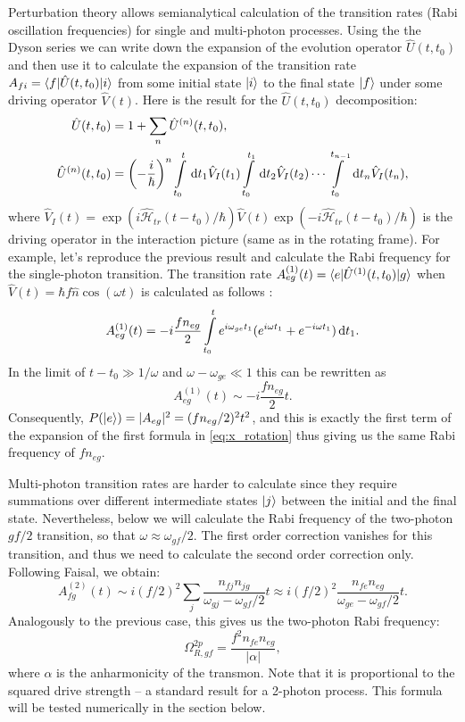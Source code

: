 Perturbation theory allows semianalytical calculation of the transition rates	(Rabi oscillation frequencies) for single and multi-photon processes. Using the the Dyson series we can write down the expansion of the evolution operator $\hat U(t, t_0)$  and then use it to calculate the expansion of the transition rate $A_{fi} = \langle f\rvert\hat U(t, t_0)\lvert i\rangle$ from some initial state $\lvert i\rangle$ to the final state $\lvert f\rangle$ under some driving operator $\hat V(t)$. Here is the result for the $\hat U(t, t_0)$ decomposition:\cite{faisal2013}
\begin{equation}
\begin{aligned}
\hat U(t, t_0) &= 1 + \sum_n \hat U^{(n)}(t, t_0),\\
\hat U^{(n)}(t, t_0) &= \left(-\frac{i}{\hbar}\right)^n\int\limits_{t_0}^t \,\mathrm{d} t_1 \hat V_I(t_1)\int\limits_{t_0}^{t_1} \,\mathrm{d} t_2 \hat V_I(t_2)\cdots\int\limits_{t_0}^{t_{n-1}} \,\mathrm{d} t_n \hat V_I(t_n),
\end{aligned}
\end{equation}
where $\hat V_I(t) = \exp(i\mathcal{\hat H}_{tr}(t-t_0)/\hbar) \hat V(t) \exp(-i\mathcal{\hat H}_{tr}(t-t_0)/\hbar)$ is the driving operator in the interaction picture (same as in the rotating frame). For example, let's reproduce the previous result and calculate the Rabi frequency for the single-photon transition.  The transition rate $A^{(1)}_{eg}(t) = \langle e\rvert\hat U^{(1)}(t, t_0)\lvert g\rangle$ when $\hat V(t) = \hbar f \hat n \cos(\omega t)$ is calculated as follows :
\begin{equation}
A^{(1)}_{eg}(t) = - i \frac{f n_{eg}}{2} \int\limits_{t_0}^t e^{i\omega_{ge} t_1} (e^{i\omega t_1}+e^{-i\omega t_1})\,\mathrm{d} t_1.
\end{equation}
In the limit of ${t-t_0\gg1/\omega}$ and $\omega - \omega_{ge}\ll1$ this can be rewritten as
\[
A^{(1)}_{eg}(t) \sim - i \frac{f n_{eg}}{2} t.
\]
Consequently, $P(\lvert e\rangle) = |A_{eg}|^2 = (f n_{eg}/2)^2t^2$, and this is exactly the first term of the expansion of the first formula in \eqref{eq:x_rotation} thus giving us the same Rabi frequency of $f n_{eg}$. 

Multi-photon transition rates are harder to calculate since they require summations over different intermediate states $\lvert j\rangle$ between the initial and the final state. Nevertheless, below we will calculate the Rabi frequency of the two-photon $gf/2$ transition, so that $\omega \approx \omega_{gf}/2$. The first order correction vanishes for this transition, and thus we need to calculate the second order correction only. Following Faisal\cite{faisal2013}, we obtain:
\[
A^{(2)}_{fg}(t) \sim  i (f/2)^2 \sum_j \frac{n_{fj}n_{jg}}{\omega_{gj}-\omega_{gf}/2} t \approx  i (f/2)^2 \frac{n_{fe}n_{eg}}{\omega_{ge}-\omega_{gf}/2} t.
\]
Analogously to the previous case, this gives us the two-photon Rabi frequency: 
\begin{equation}
\Omega_{R, gf}^{2p} = \frac{f^2  n_{fe}n_{eg}}{|\alpha|} ,
\label{eq:rabi_2p}
\end{equation}
where $\alpha$ is the anharmonicity of the transmon. Note that it is proportional to the squared drive strength -- a standard result for a 2-photon process. This formula will be tested numerically in the section below.
 

